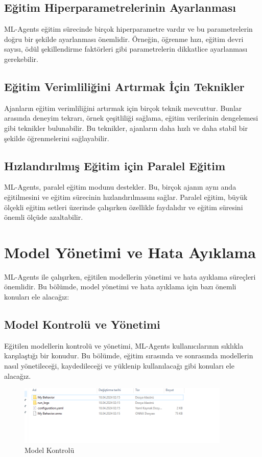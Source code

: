 \documentclass{article}
\begin{document}
    \subsection{Eğitim Hiperparametrelerinin Ayarlanması}
        ML-Agents eğitim sürecinde birçok hiperparametre vardır ve bu parametrelerin doğru bir şekilde ayarlanması önemlidir. Örneğin, öğrenme hızı, eğitim devri sayısı, ödül şekillendirme faktörleri gibi parametrelerin dikkatlice ayarlanması gerekebilir.

    \subsection{Eğitim Verimliliğini Artırmak İçin Teknikler}
        Ajanların eğitim verimliliğini artırmak için birçok teknik mevcuttur. Bunlar arasında deneyim tekrarı, örnek çeşitliliği sağlama, eğitim verilerinin dengelemesi gibi teknikler bulunabilir. Bu teknikler, ajanların daha hızlı ve daha stabil bir şekilde öğrenmelerini sağlayabilir.

    \subsection{Hızlandırılmış Eğitim için Paralel Eğitim}
        ML-Agents, paralel eğitim modunu destekler. Bu, birçok ajanın aynı anda eğitilmesini ve eğitim sürecinin hızlandırılmasını sağlar. Paralel eğitim, büyük ölçekli eğitim setleri üzerinde çalışırken özellikle faydalıdır ve eğitim süresini önemli ölçüde azaltabilir.

    
\section{Model Yönetimi ve Hata Ayıklama}
    ML-Agents ile çalışırken, eğitilen modellerin yönetimi ve hata ayıklama süreçleri önemlidir. Bu bölümde, model yönetimi ve hata ayıklama için bazı önemli konuları ele alacağız:

    \subsection{Model Kontrolü ve Yönetimi}
        Eğitilen modellerin kontrolü ve yönetimi, ML-Agents kullanıcılarının sıklıkla karşılaştığı bir konudur. Bu bölümde, eğitim sırasında ve sonrasında modellerin nasıl yönetileceği, kaydedileceği ve yüklenip kullanılacağı gibi konuları ele alacağız.

        \begin{figure}[h]
    \centering
    \includegraphics[width=0.9\textwidth]{onnx.PNG}
    \caption{Model Kontrolü} 
    \label{fig:resim17}
    \end{figure}
    
\end{document}
